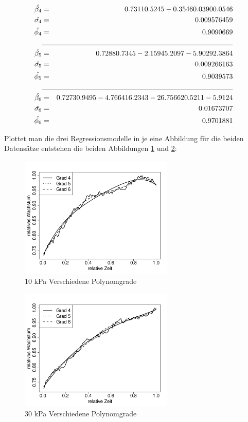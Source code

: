 \documentclass[12pt,a4paper]{article}
\theoremstyle{definition}
\theoremstyle{definition}
\theoremstyle{definition}
\theoremstyle{definition}
\begin{document}
\begin{eqnarray*}
\hat{\beta_{4}} &=&  0.7311  0.5245 -0.3546  0.0390  0.0546  \\
\hat{\sigma_{4}} &=& 0.009576459 \\
\hat{\phi_{4}} &=& 0.9090669 \\
\cline{2-3}
\hat{\beta_{5}} &=&   0.7288   0.7345  -2.1594   5.2097  -5.9029   2.3864 \\
\hat{\sigma_{5}} &=& 0.009266163 \\
\hat{\phi_{5}} &=& 0.9039573 \\
\cline{2-3}
\hat{\beta_{6}} &=&   0.7273   0.9495  -4.7664  16.2343 -26.7566  20.5211  -5.9124  \\
\hat{\sigma_{6}} &=& 0.01673707 \\
\hat{\phi_{6}} &=&  0.9701881
\end{eqnarray*}

Plottet man die drei Regressionsmodelle in je eine Abbildung für die beiden Datensätze entstehen die beiden Abbildungen \ref{10kPa-Polynomregressionen} und \ref{30kPa-Polynomregressionen}:

\begin{figure}[H] 
  \centering
     \includegraphics[width=0.65\textwidth]{10kPa-poly.pdf}
  \caption{10 kPa Verschiedene Polynomgrade}
  \label{10kPa-Polynomregressionen}
\end{figure}


\begin{figure}[H] 
  \centering
     \includegraphics[width=0.65\textwidth]{30kPa-poly.pdf}
  \caption{30 kPa Verschiedene Polynomgrade}
  \label{30kPa-Polynomregressionen}
\end{figure}
\end{document}
